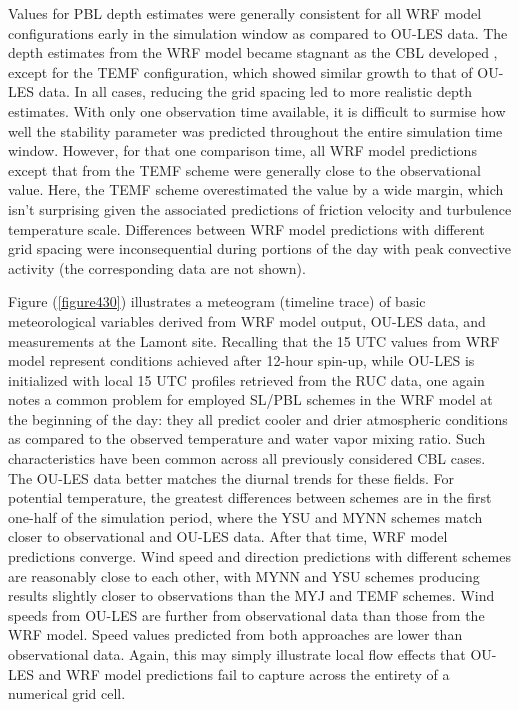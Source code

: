 Values for PBL depth estimates were generally consistent for all WRF model configurations early in the simulation window as compared to OU-LES data. The depth estimates from the WRF model became stagnant as the CBL developed , except for the TEMF configuration, which showed similar growth to that of OU-LES data. In all cases, reducing the grid spacing led to more realistic depth estimates. With only one observation time available, it is difficult to surmise how well the stability parameter was predicted throughout the entire simulation time window. However, for that one comparison time, all WRF model predictions except that from the TEMF scheme were generally close to the observational value. Here, the TEMF scheme overestimated the value by a wide margin, which isn't surprising given the associated predictions of friction velocity and turbulence temperature scale. Differences between WRF model predictions with different grid spacing were inconsequential during portions of the day with peak convective activity (the corresponding data are not shown). 

Figure (\autoref{figure430}) illustrates a meteogram (timeline trace) of basic meteorological variables derived from WRF model output, OU-LES data, and measurements at the Lamont site. Recalling that the 15 UTC values from WRF model represent conditions achieved after 12-hour spin-up, while OU-LES is initialized with local 15 UTC profiles retrieved from the RUC data, one again notes a common problem for employed SL\slash PBL schemes in the WRF model at the beginning of the day: they all predict cooler and drier atmospheric conditions as compared to the observed temperature and water vapor mixing ratio. Such characteristics have been common across all previously considered CBL cases. The OU-LES data better matches the diurnal trends for these fields. For potential temperature, the greatest differences between schemes are in the first one-half of the simulation period, where the YSU and MYNN schemes match closer to observational and OU-LES data. After that time, WRF model predictions converge. Wind speed and direction predictions with different schemes are reasonably close to each other, with MYNN and YSU schemes producing results slightly closer to observations than the MYJ and TEMF schemes. Wind speeds from OU-LES are further from observational data than those from the WRF model. Speed values predicted from both approaches are lower than observational data. Again, this may simply illustrate local flow effects that OU-LES and WRF model predictions fail to capture across the entirety of a numerical grid cell.


